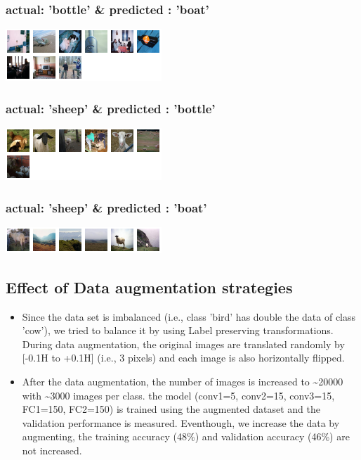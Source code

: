 \documentclass[fleqn]{article}
\begin{document}
\subsubsection{actual: 'bottle' \& predicted : 'boat'}
\includegraphics[scale=1.5]{./pics/miscallssify_bottle_to_boat.png}\\

\subsubsection{actual: 'sheep' \& predicted : 'bottle'}
\includegraphics[scale=1.5]{./pics/miscallssify_sheep_to_bottle.png}\\

\subsubsection{actual: 'sheep' \& predicted : 'boat'}
\includegraphics[scale=1.5]{./pics/miscallssify_sheep_to_boat.png}\\

\subsection{Effect of Data augmentation strategies}

\begin{itemize}
  \item Since the data set is imbalanced (i.e., class 'bird' has double the data of class 'cow'), we tried to balance it by using Label preserving transformations.
 During data augmentation, the original images are translated randomly by [-0.1H to +0.1H] (i.e., 3 pixels) and each image is also horizontally flipped.
 \item After the data augmentation, the number of images is increased to \textasciitilde20000 with \textasciitilde3000 images per class.
 the model (conv1=5, conv2=15, conv3=15, FC1=150, FC2=150) is trained using the augmented dataset and the validation performance is measured.
 Eventhough, we increase the data by augmenting, the training accuracy (48\%) and validation accuracy (46\%) are not increased.
\end{itemize}
\end{document}
